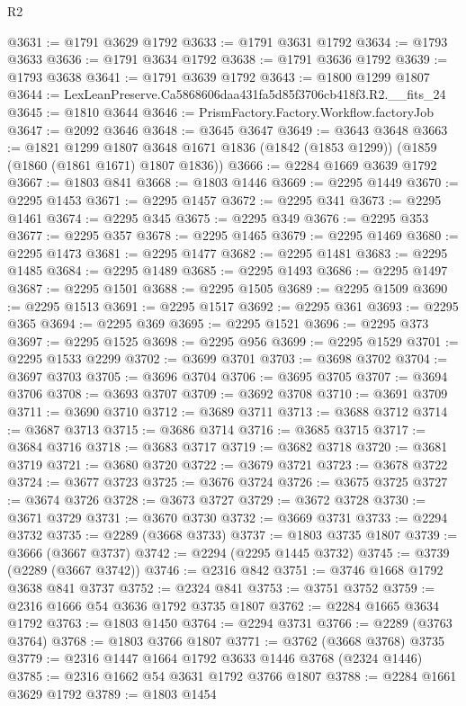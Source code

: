 \begin{lexlean}{R2}
\begin{coremodule}
@3631 := @1791 @3629 @1792
@3633 := @1791 @3631 @1792
@3634 := @1793 @3633
@3636 := @1791 @3634 @1792
@3638 := @1791 @3636 @1792
@3639 := @1793 @3638
@3641 := @1791 @3639 @1792
@3643 := @1800 @1299 @1807
@3644 := LexLeanPreserve.Ca5868606daa431fa5d85f3706cb418f3.R2.__fits_24
@3645 := @1810 @3644
@3646 := PrismFactory.Factory.Workflow.factoryJob
@3647 := @2092 @3646
@3648 := @3645 @3647
@3649 := @3643 @3648
@3663 := @1821
    @1299
    @1807
    @3648
    @1671
    @1836
    (@1842 (@1853 @1299))
    (@1859 (@1860 (@1861 @1671) @1807 @1836))
@3666 := @2284 @1669 @3639 @1792
@3667 := @1803 @841
@3668 := @1803 @1446
@3669 := @2295 @1449
@3670 := @2295 @1453
@3671 := @2295 @1457
@3672 := @2295 @341
@3673 := @2295 @1461
@3674 := @2295 @345
@3675 := @2295 @349
@3676 := @2295 @353
@3677 := @2295 @357
@3678 := @2295 @1465
@3679 := @2295 @1469
@3680 := @2295 @1473
@3681 := @2295 @1477
@3682 := @2295 @1481
@3683 := @2295 @1485
@3684 := @2295 @1489
@3685 := @2295 @1493
@3686 := @2295 @1497
@3687 := @2295 @1501
@3688 := @2295 @1505
@3689 := @2295 @1509
@3690 := @2295 @1513
@3691 := @2295 @1517
@3692 := @2295 @361
@3693 := @2295 @365
@3694 := @2295 @369
@3695 := @2295 @1521
@3696 := @2295 @373
@3697 := @2295 @1525
@3698 := @2295 @956
@3699 := @2295 @1529
@3701 := @2295 @1533 @2299
@3702 := @3699 @3701
@3703 := @3698 @3702
@3704 := @3697 @3703
@3705 := @3696 @3704
@3706 := @3695 @3705
@3707 := @3694 @3706
@3708 := @3693 @3707
@3709 := @3692 @3708
@3710 := @3691 @3709
@3711 := @3690 @3710
@3712 := @3689 @3711
@3713 := @3688 @3712
@3714 := @3687 @3713
@3715 := @3686 @3714
@3716 := @3685 @3715
@3717 := @3684 @3716
@3718 := @3683 @3717
@3719 := @3682 @3718
@3720 := @3681 @3719
@3721 := @3680 @3720
@3722 := @3679 @3721
@3723 := @3678 @3722
@3724 := @3677 @3723
@3725 := @3676 @3724
@3726 := @3675 @3725
@3727 := @3674 @3726
@3728 := @3673 @3727
@3729 := @3672 @3728
@3730 := @3671 @3729
@3731 := @3670 @3730
@3732 := @3669 @3731
@3733 := @2294 @3732
@3735 := @2289 (@3668 @3733)
@3737 := @1803 @3735 @1807
@3739 := @3666 (@3667 @3737)
@3742 := @2294 (@2295 @1445 @3732)
@3745 := @3739 (@2289 (@3667 @3742))
@3746 := @2316 @842
@3751 := @3746 @1668 @1792 @3638 @841 @3737
@3752 := @2324 @841
@3753 := @3751 @3752
@3759 := @2316 @1666 @54 @3636 @1792 @3735 @1807
@3762 := @2284 @1665 @3634 @1792
@3763 := @1803 @1450
@3764 := @2294 @3731
@3766 := @2289 (@3763 @3764)
@3768 := @1803 @3766 @1807
@3771 := @3762 (@3668 @3768) @3735
@3779 := @2316 @1447 @1664 @1792 @3633 @1446 @3768 (@2324 @1446)
@3785 := @2316 @1662 @54 @3631 @1792 @3766 @1807
@3788 := @2284 @1661 @3629 @1792
@3789 := @1803 @1454

\end{coremodule}
\end{lexlean}
